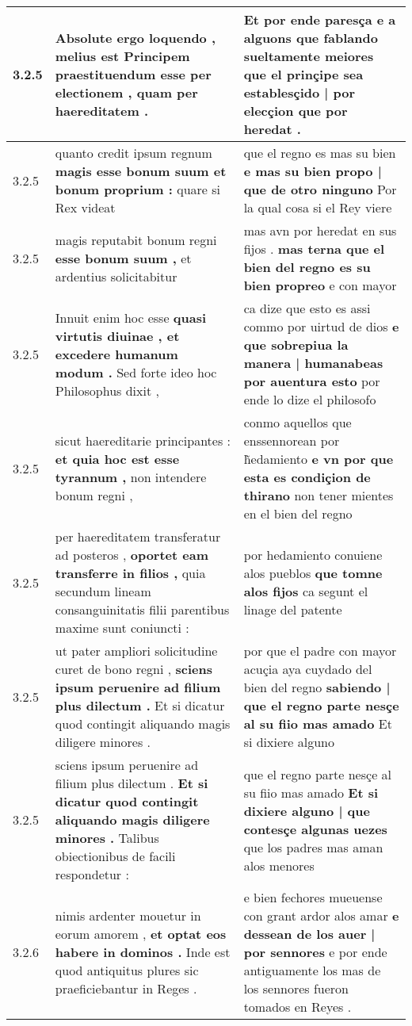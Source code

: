 \begin{tabular}{|p{1cm}|p{6.5cm}|p{6.5cm}|}
3.2.5 & Absolute ergo loquendo , \textbf{ melius est Principem praestituendum esse per electionem , } quam per haereditatem . & Et por ende paresça e a alguons que fablando sueltamente meiores \textbf{ que el prinçipe sea establesçido | por elecçion } que por heredat . \\\hline
3.2.5 & quanto credit ipsum regnum \textbf{ magis esse bonum suum et bonum proprium : } quare si Rex videat & que el regno es mas su bien \textbf{ e mas su bien propo | que de otro ninguno } Por la qual cosa si el Rey viere \\\hline
3.2.5 & magis reputabit bonum regni \textbf{ esse bonum suum , } et ardentius solicitabitur & mas avn por heredat en sus fijos . \textbf{ mas terna que el bien del regno es su bien propreo } e con mayor \\\hline
3.2.5 & Innuit enim hoc esse \textbf{ quasi virtutis diuinae , et excedere humanum modum . } Sed forte ideo hoc Philosophus dixit , & ca dize que esto es assi commo por uirtud de dios \textbf{ e que sobrepiua la manera | humanabeas por auentura esto } por ende lo dize el philosofo \\\hline
3.2.5 & sicut haereditarie principantes : \textbf{ et quia hoc est esse tyrannum , } non intendere bonum regni , & conmo aquellos que enssennorean por h̃edamiento \textbf{ e vn por que esta es condiçion de thirano } non tener mientes en el bien del regno \\\hline
3.2.5 & per haereditatem transferatur ad posteros , \textbf{ oportet eam transferre in filios , } quia secundum lineam consanguinitatis filii parentibus maxime sunt coniuncti : & por hedamiento conuiene alos pueblos \textbf{ que tomne alos fijos } ca segunt el linage del patente \\\hline
3.2.5 & ut pater ampliori solicitudine curet de bono regni , \textbf{ sciens ipsum peruenire ad filium plus dilectum . } Et si dicatur quod contingit aliquando magis diligere minores . & por que el padre con mayor acuçia aya cuydado del bien del regno \textbf{ sabiendo | que el regno parte nesçe al su fiio mas amado } Et si dixiere alguno \\\hline
3.2.5 & sciens ipsum peruenire ad filium plus dilectum . \textbf{ Et si dicatur quod contingit aliquando magis diligere minores . } Talibus obiectionibus de facili respondetur : & que el regno parte nesçe al su fiio mas amado \textbf{ Et si dixiere alguno | que contesçe algunas uezes } que los padres mas aman alos menores \\\hline
3.2.6 & nimis ardenter mouetur in eorum amorem , \textbf{ et optat eos habere in dominos . } Inde est quod antiquitus plures sic praeficiebantur in Reges . & e bien fechores mueuense con grant ardor alos amar \textbf{ e dessean de los auer | por sennores } e por ende antiguamente los mas de los sennores fueron tomados en Reyes . \\\hline

\end{tabular}
